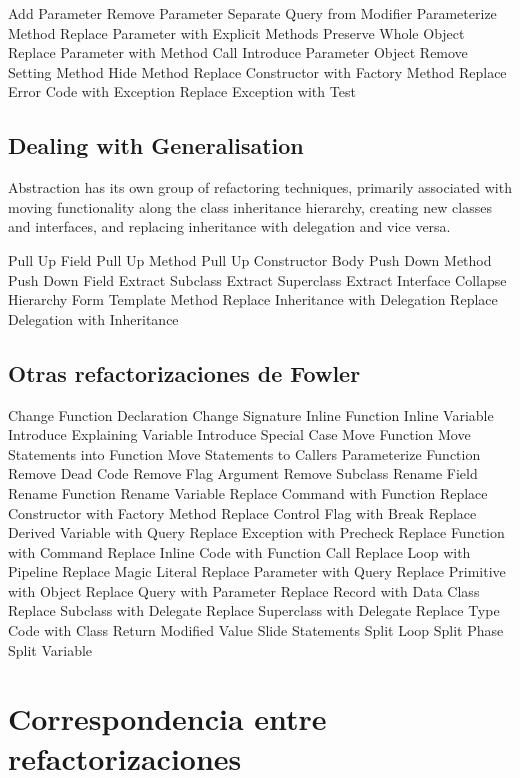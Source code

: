 \documentclass[11pt,a4paper,oneside]{book}
\begin{document}
    Add Parameter
    Remove Parameter
    Separate Query from Modifier
    Parameterize Method
    Replace Parameter with Explicit Methods
    Preserve Whole Object
    Replace Parameter with Method Call
    Introduce Parameter Object
    Remove Setting Method
    Hide Method
    Replace Constructor with Factory Method
    Replace Error Code with Exception
    Replace Exception with Test




\section{Dealing with Generalisation}

Abstraction has its own group of refactoring techniques, primarily associated with moving functionality along the class inheritance hierarchy, creating new classes and interfaces, and replacing inheritance with delegation and vice versa.

    Pull Up Field
    Pull Up Method
    Pull Up Constructor Body
    Push Down Method
    Push Down Field
    Extract Subclass
    Extract Superclass
    Extract Interface
    Collapse Hierarchy
    Form Template Method
    Replace Inheritance with Delegation
    Replace Delegation with Inheritance

\section{Otras refactorizaciones de Fowler}
Change Function Declaration
Change Signature 
Inline Function
Inline Variable
Introduce Explaining Variable
Introduce Special Case
Move Function
Move Statements into Function
Move Statements to Callers
Parameterize Function
Remove Dead Code
Remove Flag Argument
Remove Subclass
Rename Field
Rename Function 
Rename Variable
Replace Command with Function
Replace Constructor with Factory Method
Replace Control Flag with Break
Replace Derived Variable with Query
Replace Exception with Precheck
Replace Function with Command
Replace Inline Code with Function Call
Replace Loop with Pipeline
Replace Magic Literal
Replace Parameter with Query
Replace Primitive with Object
Replace Query with Parameter
Replace Record with Data Class
Replace Subclass with Delegate
Replace Superclass with Delegate
Replace Type Code with Class
Return Modified Value
Slide Statements
Split Loop
Split Phase
Split Variable



\chapter*{Correspondencia entre refactorizaciones}
\end{document}
